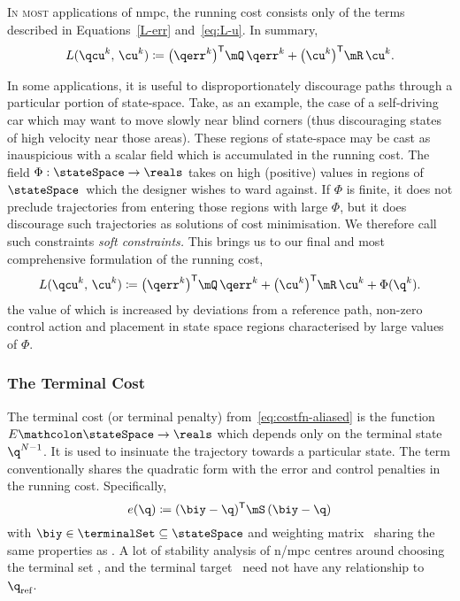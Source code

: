 \textsc{In most} applications of \ac{nmpc}, the running cost consists only of the terms described in Equations~\eqref{L-err} and~\eqref{eq:L-u}. In summary,
%
\begin{equation}\label{L-err-u}
  L(\qcu^k,\,\cu^k) \coloneq \bigl(\qerr^k\bigr)\tr\mQ\,\qerr^k + \bigl(\cu^k\bigr)\tr\mR\,\cu^k.
\end{equation}

In some applications, it is useful to disproportionately discourage paths
through a particular portion of state-space. Take, as an example, the case of a
self-driving car which may want to move slowly near blind corners (thus
discouraging states of high velocity near those areas). These regions of
state-space may be cast as inauspicious with a scalar field which is accumulated in
the running cost. The field $\Phi:\stateSpace\rightarrow\reals$ takes on high
(positive) values in regions of $\stateSpace$\ which the designer wishes to ward
against. If $\Phi$ is finite, it does not preclude trajectories from entering
those regions with large $\Phi$, but it does discourage such trajectories as
solutions of cost minimisation. We therefore call such constraints \emph{soft
constraints.} This brings us to our final and most
comprehensive formulation of the running cost,
%
\begin{equation}\label{eq:L-err-u-Phi}
  L(\qcu^k,\,\cu^k) \coloneq \bigl(\qerr^k\bigr)\tr\mQ\,\qerr^k + \bigl(\cu^k\bigr)\tr\mR\,\cu^k + \Phi(\q^k).
\end{equation}
%
the value of which is increased by deviations from a reference path, non-zero
control action and placement in state space regions characterised by large
values of $\Phi$.



\subsubsection{The Terminal Cost}


The terminal cost (or terminal penalty) from~\eqref{eq:costfn-aliased} is the
function $E\mathcolon\stateSpace\rightarrow\reals$ which depends only on the
terminal state $\q^{N-1}$. It is used to insinuate the trajectory towards a
particular state. The term conventionally shares the quadratic form with the
error and control penalties in the running cost. Specifically,
%
\begin{equation}\label{eq:terminal-cost}
  e(\q) \coloneq (\biy-\q)\tr\mS\,(\biy-\q)
\end{equation}
%
with  $\biy\in\terminalSet\subseteq\stateSpace$ and weighting matrix \mS\
sharing the same properties as \mQ. A lot of stability analysis of \ac{n/mpc}
centres around choosing the terminal set \terminalSet, and the terminal target
\biy\ need not have any relationship to $\q\rnc$.

